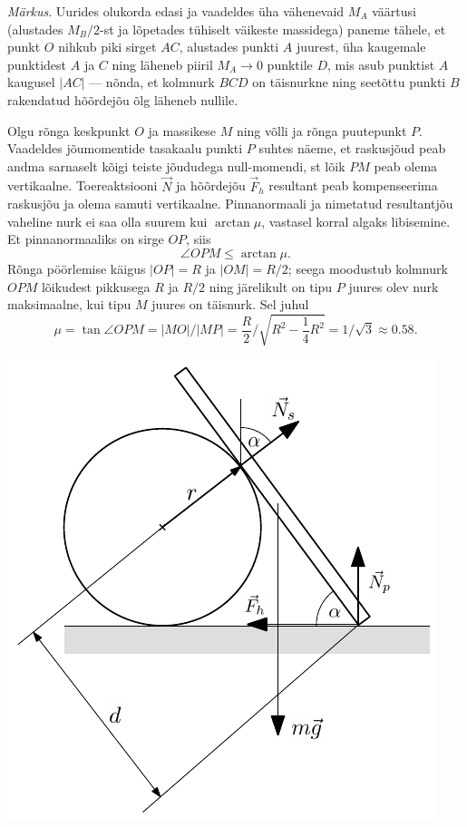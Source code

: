 \documentclass[10pt, twoside]{article}
\begin{document}
{\emph{Märkus}. Uurides olukorda edasi ja vaadeldes üha vähenevaid $M_A$ väärtusi (alustades $M_B/2$-st ja lõpetades tühiselt väikeste massidega) paneme tähele, et punkt $O$ nihkub piki sirget $AC$, alustades punkti $A$ juurest, üha kaugemale punktidest $A$ ja $C$ ning läheneb piiril $M_A \rightarrow 0$ punktile $D$, mis asub punktist $A$ kaugusel $|AC|$ --- nõnda, et kolmnurk $BCD$ on täisnurkne ning seetõttu punkti $B$ rakendatud hõõrdejõu õlg läheneb nullile.
\probend
\bigskip


\solu
Olgu rõnga keskpunkt $O$ ja massikese $M$ ning võlli ja rõnga puutepunkt $P$. Vaadeldes jõumomentide tasakaalu punkti $P$ suhtes näeme, et raskusjõud peab andma
sarnaselt kõigi teiste jõududega null-momendi, st lõik $PM$ peab olema vertikaalne.
Toereaktsiooni $\vec N$ ja hõõrdejõu $\vec F_h$ resultant peab kompenseerima raskusjõu ja olema samuti vertikaalne. Pinnanormaali ja nimetatud resultantjõu vaheline nurk ei
saa olla suurem kui $\arctan\mu$, vastasel korral algaks libisemine. Et pinnanormaaliks on sirge $OP$, siis
\[
\angle O P M \leq \arctan \mu.
\]
Rõnga pöörlemise käigus $|OP| = R$ ja $|OM| = R/2$; seega moodustub kolmnurk
$OPM$ lõikudest pikkusega $R$ ja $R/2$ ning järelikult on tipu $P$ juures olev nurk
maksimaalne, kui tipu $M$ juures on täisnurk. Sel juhul
\[
\mu=\tan \angle O P M=|M O| /|M P|=\frac{R}{2} / \sqrt{R^{2}-\frac{1}{4} R^{2}}=1 / \sqrt{3} \approx \num{0,58}.
\]
\probend
\bigskip


\solu
\begin{center}
	\includegraphics[width=0.7\linewidth]{2008-v3g-09-lah1.pdf}
\end{center}

}
\end{document}
